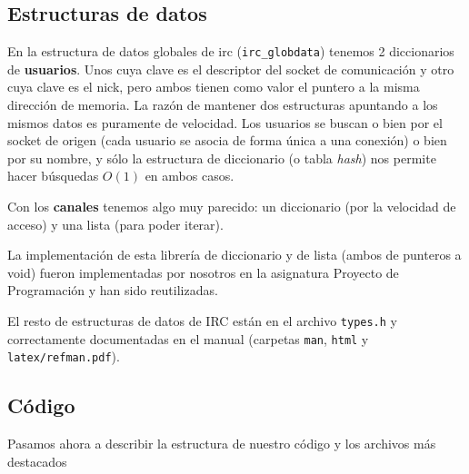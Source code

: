 \documentclass{article}
\begin{document}
\subsection{Estructuras de datos}

En la estructura de datos globales de irc (\texttt{irc\_globdata}) tenemos 2 diccionarios de \textbf{usuarios}. Unos cuya clave es el descriptor del socket de comunicación y otro cuya clave es el nick, pero ambos tienen como valor el puntero a la misma dirección de memoria. La razón de mantener dos estructuras apuntando a los mismos datos es puramente de velocidad. Los usuarios se buscan o bien por el socket de origen (cada usuario se asocia de forma única a una conexión) o bien por su nombre, y sólo la estructura de diccionario (o tabla \textit{hash}) nos permite hacer búsquedas $O(1)$ en ambos casos.

Con los \textbf{canales} tenemos algo muy parecido: un diccionario (por la velocidad de acceso) y una lista (para poder iterar).

La implementación de esta librería de diccionario y de lista (ambos de punteros a void) fueron implementadas por nosotros en la asignatura Proyecto de Programación y han sido reutilizadas. 

El resto de estructuras de datos de IRC están en el archivo \texttt{types.h} y correctamente documentadas en el manual (carpetas \texttt{man}, \texttt{html} y \texttt{latex/refman.pdf}).

\subsection{Código}

Pasamos ahora a describir la estructura de nuestro código y los archivos más destacados
\end{document}
